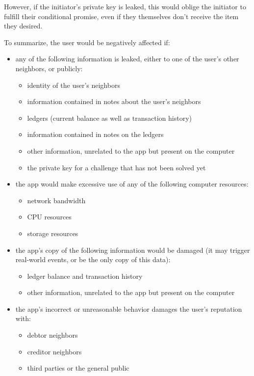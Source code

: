 \documentclass[11pt,twoside,a4paper]{article}
\begin{document}
However, if the initiator's private key is leaked, this would oblige the initiator to fulfill their conditional promise, even if they themselves don't receive the item they desired.

To summarize, the user would be negatively affected if:

\begin{itemize}
\item any of the following information is leaked, either to one of the user's other neighbors, or publicly:
  \begin{itemize}
  \item identity of the user's neighbors
  \item information contained in notes about the user's neighbors
  \item ledgers (current balance as well as transaction history)
  \item information contained in notes on the ledgers
  \item other information, unrelated to the app but present on the computer
  \item the private key for a challenge that has not been solved yet
  \end{itemize}
  
\item the app would make excessive use of any of the following computer resources:
  \begin{itemize}
  \item network bandwidth
  \item CPU resources
  \item storage resources
  \end{itemize}
  
\item the app's copy of the following information would be damaged (it may trigger real-world events, or be the only copy of this data):
  \begin{itemize}
  \item ledger balance and transaction history
  \item other information, unrelated to the app but present on the computer
  \end{itemize}
  
\item the app's incorrect or unreasonable behavior damages the user's reputation with:
  \begin{itemize}
  \item debtor neighbors
  \item creditor neighbors
  \item third parties or the general public
  \end{itemize}
\end{itemize}
\end{document}
